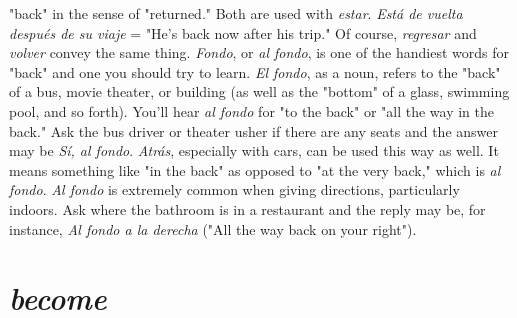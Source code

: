 "back" in the sense of "returned." Both are used with \emph{estar}. \emph{Está de
vuelta después de su viaje} = "He's back now after his trip." Of course,
\emph{regresar} and \emph{volver} convey the same thing.
\emph{Fondo}, or \emph{al fondo}, is one of the handiest words for "back"
and one you should try to learn. \emph{El fondo}, as a noun, refers to the
"back" of a bus, movie theater, or building (as well as the "bottom"
of a glass, swimming pool, and so forth). You'll hear \emph{al fondo} for "to
the back" or "all the way in the back." Ask the bus driver or theater
usher if there are any seats and the answer may be \emph{Sí, al fondo}. \emph{Atrás},
especially with cars, can be used this way as well. It means something
like "in the back" as opposed to "at the very back," which is \emph{al fondo}.
\emph{Al fondo} is extremely common when giving directions, particularly
indoors. Ask where the bathroom is in a restaurant and the reply may
be, for instance, \emph{Al fondo a la derecha} ("All the way back on your
right").

\section{\emph{become}}

